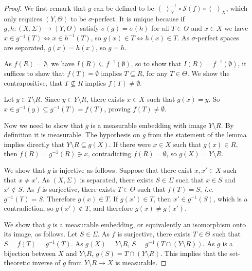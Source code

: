 \documentclass{lmcs}
\newcommand{\blank}{\ensuremath{{\mbox{-}}}}
\newcommand{\princip}[1]{\left\langle #1 \right\rangle}
\newcommand{\Sik}{\mathcal{S}}
\begin{document}
\begin{proof}
We first remark that $g$ can be defined to be $\princip{\blank}^{-1}_Y \circ \Sik(f) \circ \princip{\blank}_X$, which only requires $(Y,\Theta)$ to be $\sigma$-perfect. It is unique because if $g,h : (X,\Sigma) \rightarrow (Y,\Theta)$ satisfy $\sigma(g) = \sigma(h)$ for all $T \in \Theta$ and $x \in X$ we have $x \in g^{-1}(T) \Leftrightarrow x \in h^{-1}(T)$, so $g(x) \in T \Leftrightarrow h(x) \in T$. As $\sigma$-perfect spaces are separated, $g(x) = h(x)$, so $g = h$. 

As $f(R) = \emptyset$, we have $I(R) \subseteq f^{-1}(\emptyset)$, so to show that $I(R) = f^{-1}(\emptyset)$, it suffices to show that $f(T) = \emptyset$ implies $T \subseteq R$, for any $T \in \Theta$. We show the contrapositive, that $T \not\subseteq R$ implies $f(T) \neq \emptyset$. 

Let $y \in T \setminus R$. Since $y \in Y \setminus R$, there exists $x \in X$ such that $g(x) = y$. So $x \in g^{-1}(y) \subseteq g^{-1}(T) = f(T)$, proving $f(T) \neq \emptyset$. 

Now we need to show that $g$ is a measurable embedding with image $Y \setminus R$. By definition it is measurable. The hypothesis on $g$ from the statement of the lemma implies directly that $Y \setminus R \subseteq g(X)$. If there were $x \in X$ such that $g(x) \in R$, then $f(R) = g^{-1}(R) \ni x$, contradicting $f(R) = \emptyset$, so $g(X) = Y \setminus R$. 

We show that $g$ is injective as follows. Suppose that there exist $x,x' \in X$ such that $x \neq x'$. As $(X,\Sigma)$ is separated, there exists $S \in \Sigma$ such that $x \in S$ and $x' \not\in S$. As $f$ is surjective, there exists $T \in \Theta$ such that $f(T) = S$, \emph{i.e.} $g^{-1}(T) = S$. Therefore $g(x) \in T$. If $g(x') \in T$, then $x' \in g^{-1}(S)$, which is a contradiction, so $g(x') \not\in T$, and therefore $g(x) \neq g(x')$. 

We show that $g$ is a measurable embedding, or equivalently an isomorphism onto its image, as follows. Let $S \in \Sigma$. As $f$ is surjective, there exists $T \in \Theta$ such that $S = f(T) = g^{-1}(T)$. As $g(X) = Y \setminus R$, $S = g^{-1}(T \cap (Y \setminus R))$. As $g$ is a bijection between $X$ and $Y \setminus R$, $g(S) = T \cap (Y \setminus R)$. This implies that the set-theoretic inverse of $g$ from $Y \setminus R \rightarrow X$ is measurable. 
\end{proof}
\end{document}
